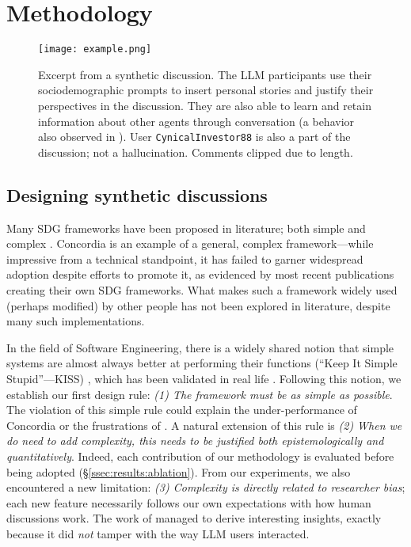 %

\section{Methodology}
\label{sec:methodology}

 \begin{figure*}[t]
	\centering
	\texttt{[image: example.png]}
	\caption{Excerpt from a synthetic discussion. The LLM participants use their sociodemographic prompts to insert personal stories and justify their perspectives in the discussion. They are also able to learn and retain information about other agents through conversation (a behavior also observed in \citet{park2023game}). User \texttt{CynicalInvestor88} is also a part of the discussion; not a hallucination. Comments clipped due to length.}
	\label{fig::example}
\end{figure*}


\subsection{Designing synthetic discussions}
\label{ssec:methodology:design}

Many SDG frameworks have been proposed in literature; both simple \citep{Tsai_Deliberate_Lab_Open-Source_2025, ulmer2024} and complex \citep{balog_2024, abdelnabi_negotiations, park2023game}. Concordia \citep{Vezhnevets2023GenerativeAM} is an example of a general, complex framework---while impressive from a technical standpoint, it has failed to garner widespread adoption despite efforts to promote it, as evidenced by most recent publications creating their own SDG frameworks. What makes such a framework widely used (perhaps modified) by other people has not been explored in literature, despite many such implementations.

In the field of Software Engineering, there is a widely shared notion that simple systems are almost always better at performing their functions (``Keep It Simple Stupid''---KISS) \citep{beck2000extreme, thomas2025simplicity}, which has been validated in real life \citep{banker1989software, ogheneovo2014relationship}. Following this notion, we establish our first design rule: \emph{(1) The framework must be as simple as possible}. The violation of this simple rule could explain the under-performance of Concordia or the frustrations of \citet{balog_2024}. A natural extension of this rule is \emph{(2) When we do need to add complexity, this needs to be justified both epistemologically and quantitatively}. Indeed, each contribution of our methodology is evaluated before being adopted (\S\ref{ssec:results:ablation}). From our experiments, we also encountered a new limitation: \emph{(3) Complexity is directly related to researcher bias}; each new feature necessarily follows our own expectations with how human discussions work. The work of \citet{park2023game} managed to derive interesting insights, exactly because it did \emph{not} tamper with the way LLM users interacted.

